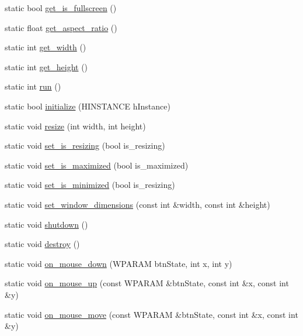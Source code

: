 \begin{DoxyCompactItemize}
\item 
static bool \hyperlink{classengine_a6e9b91614ba8c7d01b25427466df632e_a6e9b91614ba8c7d01b25427466df632e}{get\+\_\+is\+\_\+fullscreen} ()
\item 
static float \hyperlink{classengine_aec4a8646ae5139982a23f45ee38b3224_aec4a8646ae5139982a23f45ee38b3224}{get\+\_\+aspect\+\_\+ratio} ()
\item 
static int \hyperlink{classengine_af69a23a9ad0d8c51fb10c92dd495fc4b_af69a23a9ad0d8c51fb10c92dd495fc4b}{get\+\_\+width} ()
\item 
static int \hyperlink{classengine_a6f588380d288dbff7f305cf5bd5351bc_a6f588380d288dbff7f305cf5bd5351bc}{get\+\_\+height} ()
\item 
static int \hyperlink{classengine_aecb22d51cc8f83cacbf3696a18d66c30_aecb22d51cc8f83cacbf3696a18d66c30}{run} ()
\item 
static bool \hyperlink{classengine_a6809dcdfe78011851e377d4729a87ee4_a6809dcdfe78011851e377d4729a87ee4}{initialize} (H\+I\+N\+S\+T\+A\+N\+CE h\+Instance)
\item 
static void \hyperlink{classengine_a2a83502d17f32c78093028f6009df8ba_a2a83502d17f32c78093028f6009df8ba}{resize} (int width, int height)
\item 
static void \hyperlink{classengine_a4ddea571d75d76bd775e956be861e90e_a4ddea571d75d76bd775e956be861e90e}{set\+\_\+is\+\_\+resizing} (bool is\+\_\+resizing)
\item 
static void \hyperlink{classengine_acfc30003bb6439de35729c4605a96b59_acfc30003bb6439de35729c4605a96b59}{set\+\_\+is\+\_\+maximized} (bool is\+\_\+maximized)
\item 
static void \hyperlink{classengine_a7a9c852daa149d85f1032dbf59784fab_a7a9c852daa149d85f1032dbf59784fab}{set\+\_\+is\+\_\+minimized} (bool is\+\_\+resizing)
\item 
static void \hyperlink{classengine_a94d7b7fe4658a482d6cd4ce747ab35da_a94d7b7fe4658a482d6cd4ce747ab35da}{set\+\_\+window\+\_\+dimensions} (const int \&width, const int \&height)
\item 
static void \hyperlink{classengine_a560e0bbabb0933eb66db1070a9cfa4ff_a560e0bbabb0933eb66db1070a9cfa4ff}{shutdown} ()
\item 
static void \hyperlink{classengine_a466bee9e1b0a66d13f486f91af70bc20_a466bee9e1b0a66d13f486f91af70bc20}{destroy} ()
\item 
static void \hyperlink{classengine_a7dc55b2d7685d1d4d9beb07969ebc5ae_a7dc55b2d7685d1d4d9beb07969ebc5ae}{on\+\_\+mouse\+\_\+down} (W\+P\+A\+R\+AM btn\+State, int x, int y)
\item 
static void \hyperlink{classengine_a2c3525052de30450a346af424c454e49_a2c3525052de30450a346af424c454e49}{on\+\_\+mouse\+\_\+up} (const W\+P\+A\+R\+AM \&btn\+State, const int \&x, const int \&y)
\item 
static void \hyperlink{classengine_a0506bbab3122241637f4070f699c6a50_a0506bbab3122241637f4070f699c6a50}{on\+\_\+mouse\+\_\+move} (const W\+P\+A\+R\+AM \&btn\+State, const int \&x, const int \&y)
\end{DoxyCompactItemize}
